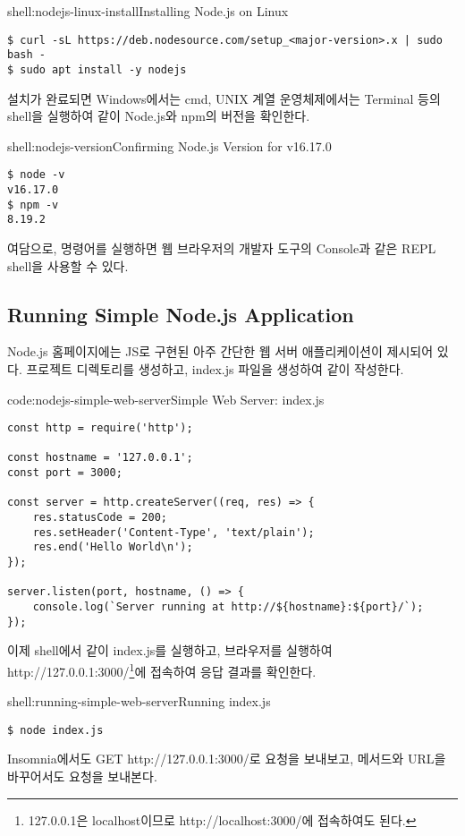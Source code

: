 \begin{shellenv}{shell:nodejs-linux-install}{Installing Node.js on Linux}\begin{verbatim}
$ curl -sL https://deb.nodesource.com/setup_<major-version>.x | sudo bash -
$ sudo apt install -y nodejs
\end{verbatim}
\end{shellenv}

설치가 완료되면 Windows에서는 cmd, UNIX 계열 운영체제에서는 Terminal 등의 shell을 실행하여 \과 같이 Node.js와 npm의 버전을 확인한다.

\begin{shellenv}{shell:nodejs-version}{Confirming Node.js Version for v16.17.0}\begin{verbatim}
$ node -v
v16.17.0
$ npm -v
8.19.2
\end{verbatim}
\end{shellenv}

여담으로,  명령어를 실행하면 웹 브라우저의 개발자 도구의 Console과 같은 REPL shell을 사용할 수 있다.

\subsection*{Running Simple Node.js Application}

Node.js 홈페이지에는 JS로 구현된 아주 간단한 웹 서버 애플리케이션이 제시되어 있다. 프로젝트 디렉토리를 생성하고, index.js 파일을 생성하여 \와 같이 작성한다.

\begin{codeenv}{code:nodejs-simple-web-server}{Simple Web Server: index.js}\begin{verbatim}
const http = require('http');

const hostname = '127.0.0.1';
const port = 3000;

const server = http.createServer((req, res) => {
    res.statusCode = 200;
    res.setHeader('Content-Type', 'text/plain');
    res.end('Hello World\n');
});

server.listen(port, hostname, () => {
    console.log(`Server running at http://${hostname}:${port}/`);
});
\end{verbatim}
\end{codeenv}

이제 shell에서 \와 같이 index.js를 실행하고, 브라우저를 실행하여 http://127.0.0.1:3000/\footnote{127.0.0.1은 localhost이므로 http://localhost:3000/에 접속하여도 된다.}에 접속하여 응답 결과를 확인한다.

\begin{shellenv}{shell:running-simple-web-server}{Running index.js}\begin{verbatim}
$ node index.js
\end{verbatim}
\end{shellenv}

Insomnia에서도 GET http://127.0.0.1:3000/로 요청을 보내보고, 메서드와 URL을 바꾸어서도 요청을 보내본다.
